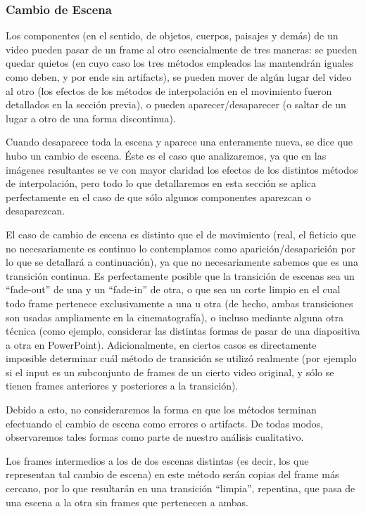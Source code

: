 \subsubsection{Cambio de Escena}
\par Los componentes (en el sentido, de objetos, cuerpos, paisajes y dem\'as) de un video pueden pasar de un frame al otro esencialmente de tres maneras: 
se pueden quedar quietos (en cuyo caso los tres m\'etodos empleados las mantendr\'an iguales como deben, y por ende sin artifacts),
se pueden mover de alg\'un lugar del video al otro (los efectos de los m\'etodos de interpolaci\'on en el movimiento fueron detallados en la secci\'on previa),
o pueden aparecer/desaparecer (o saltar de un lugar a otro de una forma discontinua).
\par Cuando desaparece toda la escena y aparece una enteramente nueva, se dice que hubo un cambio de escena.
\'Este es el caso que analizaremos, ya que en las im\'agenes resultantes se ve con mayor claridad los efectos de los distintos m\'etodos de interpolaci\'on, pero todo lo que detallaremos en esta secci\'on se aplica perfectamente en el caso de que s\'olo algunos componentes aparezcan o desaparezcan.
\par El caso de cambio de escena es distinto que el de movimiento (real, el ficticio que no necesariamente es continuo lo contemplamos como aparici\'on/desaparici\'on por lo que se detallar\'a a continuaci\'on), ya que no necesariamente sabemos que es una transici\'on continua. 
Es perfectamente posible que la transici\'on de escenas sea un ``fade-out'' de una y un ``fade-in'' de otra, o que sea un corte limpio en el cual todo frame pertenece exclusivamente a una u otra (de hecho, ambas transiciones son usadas ampliamente en la cinematograf\'ia), o incluso mediante alguna otra t\'ecnica (como ejemplo, considerar las distintas formas de pasar de una diapositiva a otra en PowerPoint).
Adicionalmente, en ciertos casos es directamente imposible determinar cu\'al m\'etodo de transici\'on se utiliz\'o realmente (por ejemplo si el input es un subconjunto de frames de un cierto video original, y s\'olo se tienen frames anteriores y posteriores a la transici\'on).
\par Debido a esto, no consideraremos la forma en que los m\'etodos terminan efectuando el cambio de escena como errores o artifacts.
De todas modos, observaremos tales formas como parte de nuestro an\'alisis cualitativo.

\par Los frames intermedios a los de dos escenas distintas (es decir, los que representan tal cambio de escena) en este m\'etodo ser\'an copias del frame m\'as cercano, por lo que resultar\'an en una transici\'on ``limpia'', repentina, que pasa de una escena a la otra sin frames que pertenecen a ambas.

